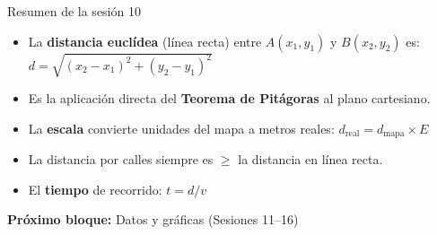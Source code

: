 \documentclass[aspectratio=169, 10pt, spanish]{beamer}
\begin{document}
\begin{frame}{Resumen de la sesión 10}
  \begin{resumenbox}
    \begin{itemize}
      \item La \textbf{distancia euclídea} (línea recta) entre
            $A(x_1,y_1)$ y $B(x_2,y_2)$ es:
            $d = \sqrt{(x_2-x_1)^2+(y_2-y_1)^2}$
      \item Es la aplicación directa del
            \textbf{Teorema de Pitágoras} al plano cartesiano.
      \item La \textbf{escala} convierte unidades del mapa
            a metros reales: $d_{\text{real}} = d_{\text{mapa}}\times E$
      \item La distancia por calles siempre es
            $\geq$ la distancia en línea recta.
      \item El \textbf{tiempo} de recorrido: $t = d / v$
    \end{itemize}
  \end{resumenbox}
  \vspace{6pt}
  \begin{center}
    {\AlmFontSmall\color{AlmAzulM}\faArrowCircleRight\enskip
    \textbf{Próximo bloque:}
    Datos y gráficas (Sesiones 11--16)}
  \end{center}
\end{frame}
\end{document}
